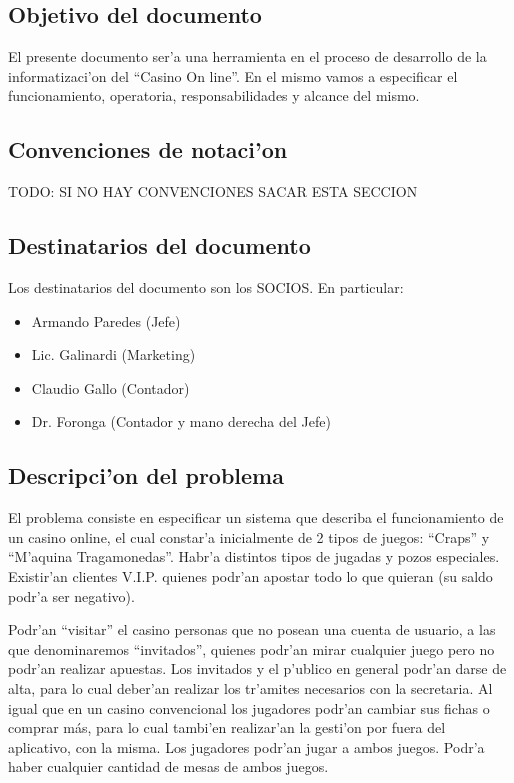 \subsection{ Objetivo del documento }

El presente documento ser'a una herramienta en el proceso 
de desarrollo de la informatizaci'on del ``Casino On line''. En el mismo 
vamos a especificar el funcionamiento, operatoria, responsabilidades y alcance
del mismo.


\subsection{ Convenciones de notaci'on	}
TODO: SI NO HAY CONVENCIONES SACAR ESTA SECCION

\subsection{ Destinatarios del documento	}
Los destinatarios del documento son los SOCIOS. En particular:

\begin{itemize}
    \item Armando Paredes (Jefe)
    \item Lic. Galinardi (Marketing)
    \item Claudio Gallo (Contador)
    \item Dr. Foronga (Contador y mano derecha del Jefe)
\end{itemize}


\subsection{ Descripci'on del problema }
El problema consiste en especificar un sistema que describa el funcionamiento
de un casino online, el cual constar'a inicialmente de 2 tipos de juegos: ``Craps'' y ``M'aquina Tragamonedas''. Habr'a distintos tipos de jugadas y pozos especiales. Existir'an clientes V.I.P. quienes podr'an apostar todo lo que quieran (su saldo podr'a ser negativo).

 Podr'an ``visitar'' el casino personas que no posean una cuenta de usuario, a las que denominaremos ``invitados'', quienes podr'an mirar cualquier juego pero no podr'an realizar apuestas. Los invitados y el p'ublico en general podr'an darse de alta, para lo cual deber'an realizar los tr'amites necesarios con la secretaria. 
Al igual que en un casino convencional los jugadores podr'an cambiar sus fichas o comprar más, para lo cual tambi'en realizar'an la gesti'on por fuera del aplicativo, con la misma.
Los jugadores podr'an jugar a ambos juegos. Podr'a haber cualquier cantidad de mesas de ambos
juegos.


